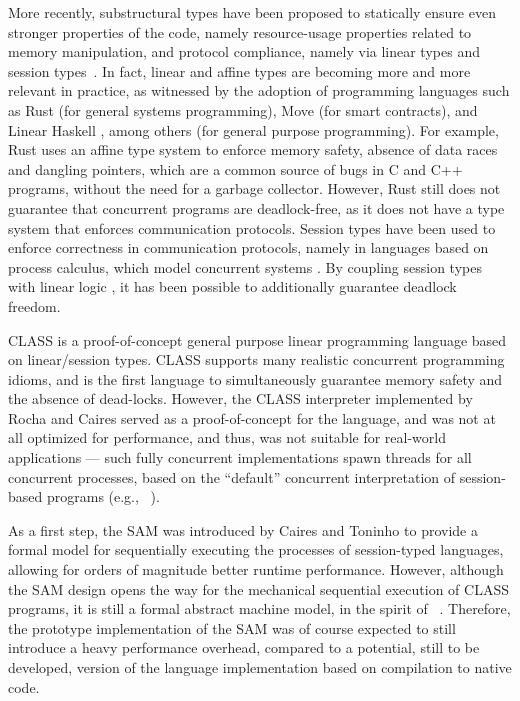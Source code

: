 More recently, substructural types have been proposed to statically ensure even stronger properties of the code, namely resource-usage properties related to memory manipulation, and protocol compliance, namely via linear types and session types~\cite{Wadler:1990,Honda:1998,Mostrous:2014}. In fact, linear and affine types are becoming more and more relevant in practice, as witnessed by the adoption of programming languages such as Rust \cite{Matsakis:2014} (for general systems programming),
Move \cite{Move:2019, Move:2020} (for smart contracts), and Linear Haskell \cite{Bernardy:2017}, among others \cite{Rast:2022, Ferrite:2022, C0:2016, FreeST:2019, Jacobs:2023} (for general purpose programming).
For example, Rust uses an affine type system to enforce memory safety, absence of data races and dangling pointers, which are a common source of bugs in C and C++ programs, without the need for a garbage collector. However, Rust still does not guarantee that concurrent programs are deadlock-free, as it does not have a type system that enforces communication protocols. Session types have been used to enforce correctness in communication protocols, namely in languages based on process calculus, which model concurrent systems \cite{Milner:1980,Milner:1992:1,Milner:1992:2}. By coupling session types with linear logic \cite{Girard:1987,Caires:2010}, it has been possible to additionally guarantee deadlock freedom. 

\ac{CLASS} \cite{Rocha:2021, Rocha:2023, Rocha:2022} is a proof-of-concept general purpose linear programming language based on linear/session types.
\ac{CLASS} supports many realistic concurrent programming idioms, and is the first language to simultaneously guarantee memory safety and the absence of dead-locks.
%
However, the \ac{CLASS} interpreter implemented by Rocha and Caires\cite{Rocha:2021:artifact,Rocha:2023:artifact} served as a proof-of-concept for the language, and was not at all optimized for performance, and thus, was not suitable for real-world applications --- such fully concurrent implementations spawn threads for all concurrent processes, based on the ``default'' concurrent interpretation of session-based programs (e.g., ~\cite{FreeST:2019,Jespersen:2015}).
%

%
As a first step, the \acf{SAM}  was introduced by Caires and Toninho \cite{Caires:2024} to provide a formal model for sequentially executing the processes of session-typed languages, allowing for orders of magnitude better runtime performance.
However, although the \ac{SAM} design opens the way for the mechanical sequential execution of CLASS programs, it is still a formal abstract machine model, in the spirit of ~\cite{Landin:1964,Lafont:1988}. Therefore, the prototype implementation of the SAM\cite{Caires:2024:artifact} was of course expected to still introduce a heavy performance overhead, compared to a potential, still to be developed, version of the language implementation based on compilation to native code.

